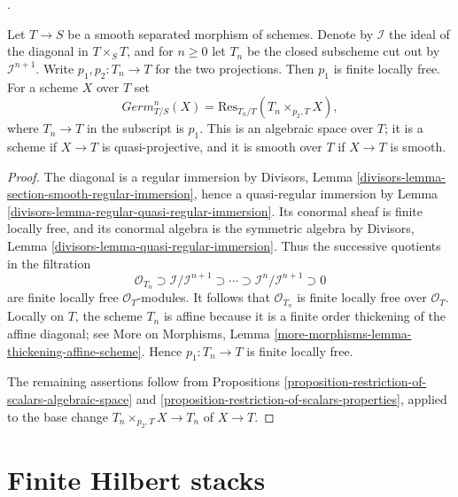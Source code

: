 \begin{example}
\label{example-bundles-infinitesimal-sections}
\begin{reference}
\cite[Expos\'e 221, discussion following Proposition 5.7]{FGA}.
\end{reference}
Let $T \to S$ be a smooth separated morphism of schemes. Denote by
$\mathcal{I}$ the ideal of the diagonal in $T \times_S T$, and for
$n \geq 0$ let $T_n$ be the closed subscheme cut out by
$\mathcal{I}^{n + 1}$. Write $p_1, p_2 : T_n \to T$ for the two
projections. Then $p_1$ is finite locally free. For a scheme $X$ over $T$
set
$$
\mathit{Germ}^n_{T/S}(X) =
\text{Res}_{T_n/T}(T_n \times_{p_2, T} X),
$$
where $T_n \to T$ in the subscript is $p_1$. This is an algebraic space
over $T$; it is a scheme if $X \to T$ is quasi-projective, and it is
smooth over $T$ if $X \to T$ is smooth.
\end{example}

\begin{proof}
The diagonal is a regular immersion by Divisors, Lemma
\ref{divisors-lemma-section-smooth-regular-immersion}, hence a
quasi-regular immersion by Lemma
\ref{divisors-lemma-regular-quasi-regular-immersion}. Its conormal sheaf
is finite locally free, and its conormal algebra is the symmetric algebra
by Divisors, Lemma \ref{divisors-lemma-quasi-regular-immersion}. Thus the
successive quotients in the filtration
$$
\mathcal{O}_{T_n} \supset \mathcal{I}/\mathcal{I}^{n + 1}
\supset \cdots \supset \mathcal{I}^n/\mathcal{I}^{n + 1}
\supset 0
$$
are finite locally free $\mathcal{O}_T$-modules. It follows that
$\mathcal{O}_{T_n}$ is finite locally free over $\mathcal{O}_T$.
Locally on $T$, the scheme $T_n$ is affine because it is a finite order
thickening of the affine diagonal; see More on Morphisms, Lemma
\ref{more-morphisms-lemma-thickening-affine-scheme}. Hence
$p_1 : T_n \to T$ is finite locally free.

The remaining assertions follow from Propositions
\ref{proposition-restriction-of-scalars-algebraic-space} and
\ref{proposition-restriction-of-scalars-properties}, applied to the base
change $T_n \times_{p_2, T} X \to T_n$ of $X \to T$.
\end{proof}






\section{Finite Hilbert stacks}
\label{section-finite-hilbert-stacks}

